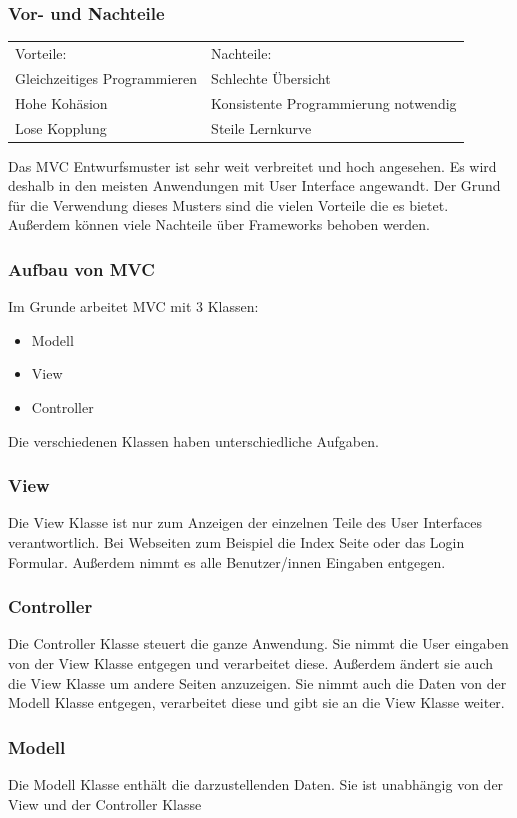 \subsubsection{Vor- und Nachteile}
\begin{tabular}{ l l }
	Vorteile: & Nachteile: \\
	Gleichzeitiges Programmieren & Schlechte Übersicht \\
	Hohe Kohäsion \cite{kohaesion} & Konsistente Programmierung notwendig\\
	Lose Kopplung \cite{kopplung} & Steile Lernkurve \\	
\end{tabular}

Das MVC Entwurfsmuster ist sehr weit verbreitet und hoch angesehen. Es wird deshalb in den meisten Anwendungen mit User Interface angewandt. Der Grund für die Verwendung dieses Musters sind die vielen Vorteile die es bietet. Außerdem können viele Nachteile über Frameworks behoben werden.

\subsubsection{Aufbau von MVC}
Im Grunde arbeitet MVC mit 3 Klassen:
\begin{itemize}
	\item Modell
	\item View
	\item Controller
\end{itemize}
Die verschiedenen Klassen haben unterschiedliche Aufgaben.

\subsubsection{View}
Die View Klasse ist nur zum Anzeigen der einzelnen Teile des User Interfaces verantwortlich. Bei Webseiten zum Beispiel die Index Seite oder das Login Formular. Außerdem nimmt es alle Benutzer/innen Eingaben entgegen.
\subsubsection{Controller}
Die Controller Klasse steuert die ganze Anwendung. Sie nimmt die User eingaben von der View Klasse entgegen und verarbeitet diese. Außerdem ändert sie auch die View Klasse um andere Seiten anzuzeigen. Sie nimmt auch die Daten von der Modell Klasse entgegen, verarbeitet diese und gibt sie an die View Klasse weiter.
\subsubsection{Modell}
Die Modell Klasse enthält die darzustellenden Daten. Sie ist unabhängig von der View und der Controller Klasse

